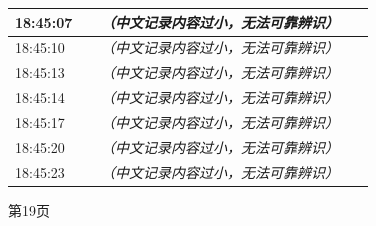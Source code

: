 \documentclass[UTF8,10pt,a4paper,fontset=fandol]{ctexart}
\begin{document}
\begin{minipage}[t]{0.47\linewidth}
\begin{tabular}{|p{0.22\linewidth}|p{0.70\linewidth}|}
18:45:07 & \textit{（中文记录内容过小，无法可靠辨识）} \\ \hline
18:45:10 & \textit{（中文记录内容过小，无法可靠辨识）} \\ \hline
18:45:13 & \textit{（中文记录内容过小，无法可靠辨识）} \\ \hline
18:45:14 & \textit{（中文记录内容过小，无法可靠辨识）} \\ \hline
18:45:17 & \textit{（中文记录内容过小，无法可靠辨识）} \\ \hline
18:45:20 & \textit{（中文记录内容过小，无法可靠辨识）} \\ \hline
18:45:23 & \textit{（中文记录内容过小，无法可靠辨识）} \\ \hline
\end{tabular}

\smallskip
第19页
\end{minipage}
\hfill
\end{document}
